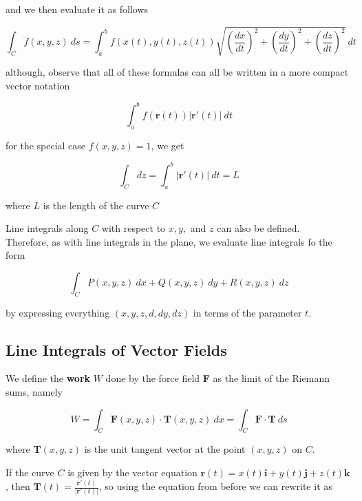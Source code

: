 \documentclass{article}
\begin{document}
and we then evaluate it as follows

\begin{equation*}
    \int_C f(x,y,z) \ ds = \int_{a}^{b} f(x(t), y(t), z(t)) \sqrt{(\frac{dx}{dt})^2 + (\frac{dy}{dt})^2 + (\frac{dz}{dt})^2} \ dt
\end{equation*}

although, observe that all of these formulas can all be written in a more compact vector notation 

\begin{equation*}
    \int_{a}^{b} f(\mathbf{r}(t)) \rvert \mathbf{r}'(t) \rvert \ dt 
\end{equation*}

for the special case $f(x,y,z) = 1$, we get 

\begin{equation*}
    \int_C dz = \int_{a}^{b} \rvert \mathbf{r}'(t) \rvert \ dt = L 
\end{equation*}

where $L$ is the length of the curve $C$

Line integrals along $C$ with respect to  $x, y, $ and $z$ can also be defined.
\\
Therefore, as with line integrals in the plane, we evaluate line integrals fo the form

\begin{equation*}
    \int_C P(x,y,z) \ dx + Q(x,y,z) \ dy + R(x,y,z) \ dz
\end{equation*}

by expressing everything $(x, y,z,d,dy,dz)$ in terms of the parameter $t$.

\subsection{Line Integrals of Vector Fields}

We define the \textbf{work} $W$ done by the force field \textbf{F} as the limit of the Riemann sums, namely

\begin{equation*}
    W = \int_C \mathbf{F}(x,y,z) \cdot \mathbf{T}(x,y,z) \ dx = \int_C \mathbf{F} \cdot \mathbf{T} \ ds
\end{equation*}

where \textbf{T}$(x,y,z)$ is the unit tangent vector at the point $(x,y,z)$ on $C$.

If the curve $C$ is given by the vector equation $\mathbf{r}(t) = x(t) \mathbf{i} + y(t) \mathbf{j} + z(t) \mathbf{k}$, then $\mathbf{T}(t) = \frac{\mathbf{r}'(t)}{\rvert \mathbf{r}'(t) \rvert}$, so using the equation from before we can rewrite it as 
\end{document}
